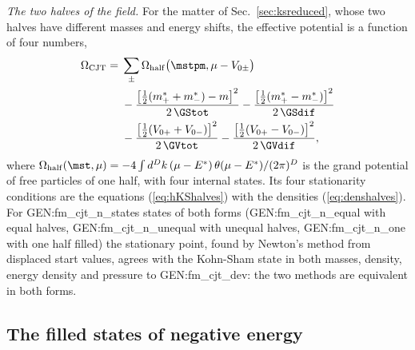 \emph{The two halves of the field.} For the matter of Sec.~\ref{sec:ksreduced}, whose two halves have
different masses and energy shifts, the effective potential is a function of four numbers,
\begin{equation}
\begin{aligned}
\Omega_{\mathrm{CJT}}={}&\sum_\pm\Omega_{\mathrm{half}}\big(\mstpm,\mu-V_{0\pm}\big)\\
&-\frac{\big[\tfrac12(m^{*}_++m^{*}_-)-m\big]^{2}}{2\,\GStot}-\frac{\big[\tfrac12(m^{*}_+-m^{*}_-)\big]^{2}}{2\,\GSdif}\\
&-\frac{\big[\tfrac12(V_{0+}+V_{0-})\big]^{2}}{2\,\GVtot}-\frac{\big[\tfrac12(V_{0+}-V_{0-})\big]^{2}}{2\,\GVdif},
\end{aligned}
\label{eq:OmegaHalves}
\end{equation}
where $\Omega_{\mathrm{half}}(\mst,\mu)=-4\int d^{D}k\,(\mu-E^{*})\,\theta(\mu-E^{*})/(2\pi)^{D}$ is the
grand potential of free particles of one half, with four internal states. Its four stationarity
conditions are the equations (\ref{eq:hKShalves}) with the densities (\ref{eq:denshalves}). For
{{GEN:fm_cjt_n_states}} states of both forms ({{GEN:fm_cjt_n_equal}} with equal halves,
{{GEN:fm_cjt_n_unequal}} with unequal halves, {{GEN:fm_cjt_n_one}} with one half filled) the
stationary point, found by Newton's method from displaced start values, agrees with the Kohn-Sham
state in both masses, density, energy density and pressure to {{GEN:fm_cjt_dev}}: the two methods
are equivalent in both forms.

\subsection{The filled states of negative energy}
\label{sec:sea}

